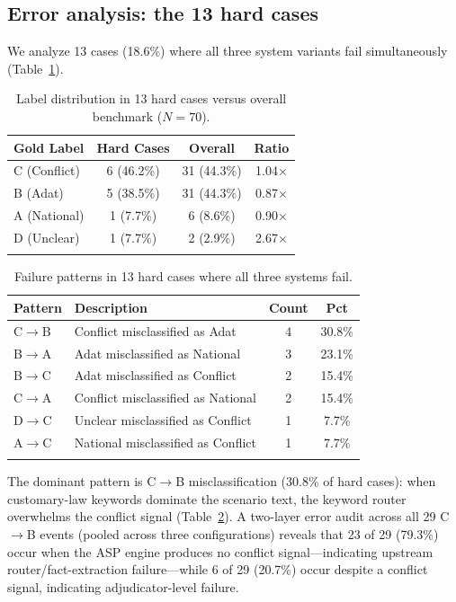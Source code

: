 \documentclass[pdflatex,sn-basic,Numbered]{sn-jnl}
\begin{document}
\subsection{Error analysis: the 13 hard cases}\label{subsec:hardcases}

We analyze 13 cases (18.6\%) where all three system variants fail simultaneously (Table~\ref{tab:hardcases-dist}).

\begin{table}[t]
\caption{Label distribution in 13 hard cases versus overall benchmark ($N=70$).}\label{tab:hardcases-dist}
\begin{tabular*}{\textwidth}{@{\extracolsep\fill}lccc}
\toprule
Gold Label & Hard Cases & Overall & Ratio \\
\midrule
C (Conflict) & 6 (46.2\%) & 31 (44.3\%) & 1.04$\times$ \\
B (Adat) & 5 (38.5\%) & 31 (44.3\%) & 0.87$\times$ \\
A (National) & 1 (7.7\%) & 6 (8.6\%) & 0.90$\times$ \\
D (Unclear) & 1 (7.7\%) & 2 (2.9\%) & 2.67$\times$ \\
\botrule
\end{tabular*}
\end{table}

\begin{table}[t]
\caption{Failure patterns in 13 hard cases where all three systems fail.}\label{tab:failure-patterns}
\begin{tabular*}{\textwidth}{@{\extracolsep\fill}llcc}
\toprule
Pattern & Description & Count & Pct \\
\midrule
C$\rightarrow$B & Conflict misclassified as Adat & 4 & 30.8\% \\
B$\rightarrow$A & Adat misclassified as National & 3 & 23.1\% \\
B$\rightarrow$C & Adat misclassified as Conflict & 2 & 15.4\% \\
C$\rightarrow$A & Conflict misclassified as National & 2 & 15.4\% \\
D$\rightarrow$C & Unclear misclassified as Conflict & 1 & 7.7\% \\
A$\rightarrow$C & National misclassified as Conflict & 1 & 7.7\% \\
\botrule
\end{tabular*}
\end{table}

The dominant pattern is C$\rightarrow$B misclassification (30.8\% of hard cases): when customary-law keywords dominate the scenario text, the keyword router overwhelms the conflict signal (Table~\ref{tab:failure-patterns}).
A two-layer error audit across all 29 C$\rightarrow$B events (pooled across three configurations) reveals that 23 of 29 (79.3\%) occur when the ASP engine produces no conflict signal---indicating upstream router/fact-extraction failure---while 6 of 29 (20.7\%) occur despite a conflict signal, indicating adjudicator-level failure.
\end{document}
